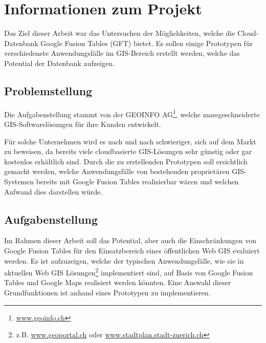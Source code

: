\chapter{Informationen zum Projekt}
\label{informationen-projekt}
Das Ziel dieser Arbeit war das Untersuchen der Möglichkeiten, welche die \gls{Cloud}-Datenbank Google Fusion Tables (GFT) bietet. Es sollen einige Prototypen für verschiedenste Anwendungsfälle im \gls{GIS}-Bereich erstellt werden, welche das Potential der Datenbank aufzeigen.

\section{Problemstellung}
Die Aufgabenstellung stammt von der GEOINFO AG\footnote{\url{www.geoinfo.ch}}, welche massgeschneiderte \gls{GIS}-Softwarelösungen für ihre Kunden entwickelt.

Für solche Unternehmen wird es nach und nach schwieriger, sich auf dem Markt zu beweisen, da bereits viele cloudbasierte \gls{GIS}-Lösungen sehr günstig oder gar kostenlos erhältlich sind. Durch die zu erstellenden Prototypen soll ersichtlich gemacht werden, welche Anwendungsfälle von bestehenden proprietären \gls{GIS}-Systemen bereits mit Google Fusion Tables realisierbar wären und welchen Aufwand dies darstellen würde.

\section{Aufgabenstellung}
Im Rahmen dieser Arbeit soll das Potential, aber auch die Einschränkungen von Google Fusion Tables für den Einsatzbereich eines öffentlichen Web \gls{GIS} evaluiert werden. Es ist aufzuzeigen, welche der typischen Anwendungsfälle, wie sie in aktuellen Web \gls{GIS} Lösungen\footnote{z.B. \url{www.geoportal.ch} oder \url{www.stadtplan.stadt-zuerich.ch}} implementiert sind, auf Basis von Google Fusion Tables und Google Maps realisiert werden könnten. Eine Auswahl dieser Grundfunktionen ist anhand eines Prototypen zu implementieren.

